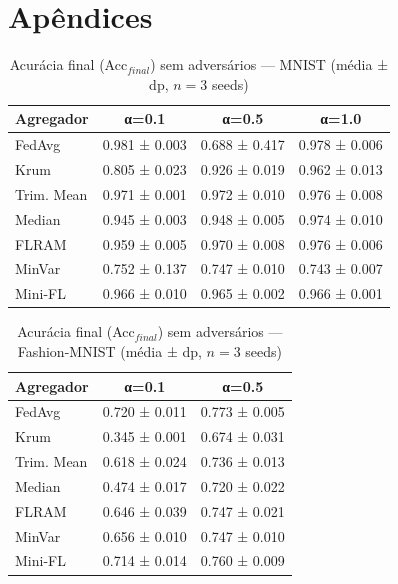 \chapter*{Apêndices}

\begin{table}[H]
\centering
\caption{Acurácia final (Acc$_{final}$) sem adversários — MNIST (média ± dp, $n=3$ seeds)}
\label{tab:clean_acc_mnist}
\footnotesize
\setlength{\tabcolsep}{3pt}
\begin{tabular}{@{}lccc@{}}
\toprule
\textbf{Agregador} & \textbf{α=0.1} & \textbf{α=0.5} & \textbf{α=1.0} \\
\midrule
FedAvg & 0.981 ± 0.003 & 0.688 ± 0.417 & 0.978 ± 0.006 \\
Krum & 0.805 ± 0.023 & 0.926 ± 0.019 & 0.962 ± 0.013 \\
Trim. Mean & 0.971 ± 0.001 & 0.972 ± 0.010 & 0.976 ± 0.008 \\
Median & 0.945 ± 0.003 & 0.948 ± 0.005 & 0.974 ± 0.010 \\
FLRAM & 0.959 ± 0.005 & 0.970 ± 0.008 & 0.976 ± 0.006 \\
MinVar & 0.752 ± 0.137 & 0.747 ± 0.010 & 0.743 ± 0.007 \\
Mini-FL & 0.966 ± 0.010 & 0.965 ± 0.002 & 0.966 ± 0.001 \\
\bottomrule
\end{tabular}
\end{table}
\begin{table}[H]
\centering
\caption{Acurácia final (Acc$_{final}$) sem adversários — Fashion-MNIST (média ± dp, $n=3$ seeds)}
\label{tab:clean_acc_fashion}
\footnotesize
\setlength{\tabcolsep}{3pt}
\begin{tabular}{@{}lcc@{}}
\toprule
\textbf{Agregador} & \textbf{α=0.1} & \textbf{α=0.5} \\
\midrule
FedAvg & 0.720 ± 0.011 & 0.773 ± 0.005 \\
Krum & 0.345 ± 0.001 & 0.674 ± 0.031 \\
Trim. Mean & 0.618 ± 0.024 & 0.736 ± 0.013 \\
Median & 0.474 ± 0.017 & 0.720 ± 0.022 \\
FLRAM & 0.646 ± 0.039 & 0.747 ± 0.021 \\
MinVar & 0.656 ± 0.010 & 0.747 ± 0.010 \\
Mini-FL & 0.714 ± 0.014 & 0.760 ± 0.009 \\
\bottomrule
\end{tabular}
\end{table}
